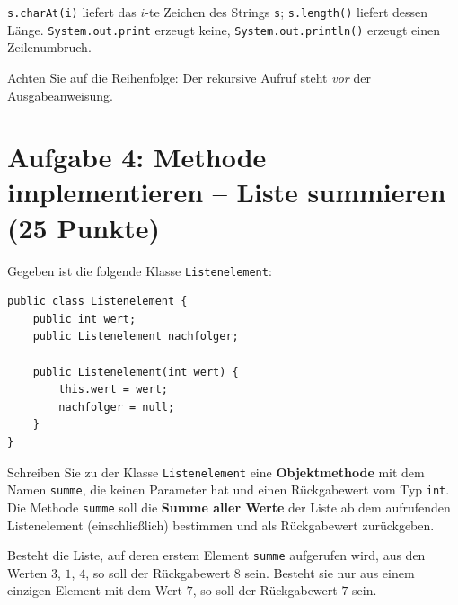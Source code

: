 \documentclass[
	fontsize=12pt,
	paper=a4,
	numbers=noenddot,
	parskip=half,
	openany
]{scrbook}
\begin{document}
\begin{hinweis}[Hinweis]
	\texttt{s.charAt(i)} liefert das $i$-te Zeichen des Strings \texttt{s}; \texttt{s.length()} liefert dessen Länge. \texttt{System.out.print} erzeugt keine, \texttt{System.out.println()} erzeugt einen Zeilenumbruch.
\end{hinweis}

\begin{hinweis}[Empfehlung]
	Achten Sie auf die Reihenfolge: Der rekursive Aufruf steht \emph{vor} der Ausgabeanweisung.
\end{hinweis}

\clearpage
\section*{Aufgabe 4: Methode implementieren -- Liste summieren \hfill (25 Punkte)}

Gegeben ist die folgende Klasse \texttt{Listenelement}:

\begin{lstlisting}
public class Listenelement {
    public int wert;
    public Listenelement nachfolger;

    public Listenelement(int wert) {
        this.wert = wert;
        nachfolger = null;
    }
}
\end{lstlisting}

Schreiben Sie zu der Klasse \texttt{Listenelement} eine \textbf{Objektmethode} mit dem Namen \texttt{summe}, die keinen Parameter hat und einen Rückgabewert vom Typ \texttt{int}. Die Methode \texttt{summe} soll die \textbf{Summe aller Werte} der Liste ab dem aufrufenden Listenelement (einschließlich) bestimmen und als Rückgabewert zurückgeben.

\begin{beispiel}[Beispiel]
	Besteht die Liste, auf deren erstem Element \texttt{summe} aufgerufen wird, aus den Werten $3$, $1$, $4$, so soll der Rückgabewert $8$ sein. Besteht sie nur aus einem einzigen Element mit dem Wert $7$, so soll der Rückgabewert $7$ sein.
\end{beispiel}
\end{document}
